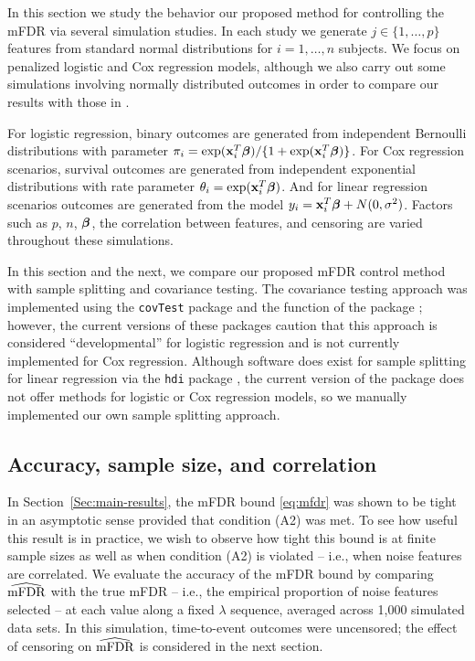 In this section we study the behavior our proposed method for controlling the mFDR via several simulation studies. In each study we generate $j \in \{1, \ldots, p\}$ features from standard normal distributions for $i = 1, \ldots, n$ subjects. We focus on penalized logistic and Cox regression models, although we also carry out some simulations involving normally distributed outcomes in order to compare our results with those in \citet{BrehenyMFDR}.

For logistic regression, binary outcomes are generated from independent Bernoulli distributions with parameter $\pi_i = \exp(\mathbf{x}_i^T \boldsymbol{\beta})/\{1 + \exp(\mathbf{x}_i^T \boldsymbol{\beta})\}$. For Cox regression scenarios, survival outcomes are generated from independent exponential distributions with rate parameter $\theta_i = \exp(\mathbf{x}_i^T \boldsymbol{\beta})$. And for linear regression scenarios outcomes are generated from the model $y_i = \mathbf{x}_i^T\boldsymbol{\beta} + N(0,\sigma^2)$. Factors such as $p$, $n$, $\boldsymbol{\beta}$, the correlation between features, and censoring are varied throughout these simulations.

In this section and the next, we compare our proposed mFDR control method with sample splitting and covariance testing.  The covariance testing approach was implemented using the {\tt covTest} package \citep{CovTest} and the  function of the  package \citep{Selective_Inference}; however, the current versions of these packages caution that this approach is considered ``developmental'' for logistic regression and is not currently implemented for Cox regression.  Although software does exist for sample splitting for linear regression via the {\tt hdi} package \cite{Dezeure2015}, the current version of the package does not offer methods for logistic or Cox regression models, so we manually implemented our own sample splitting approach.

\subsection{Accuracy, sample size, and correlation}
\label{Sec:accuracy}

In Section~\ref{Sec:main-results}, the mFDR bound \eqref{eq:mfdr} was shown to be tight in an asymptotic sense provided that condition (A2) was met.  To see how useful this result is in practice, we wish to observe how tight this bound is at finite sample sizes as well as when condition (A2) is violated -- i.e., when noise features are correlated.
We evaluate the accuracy of the mFDR bound by comparing $\widehat{\textrm{mFDR}}$ with the true mFDR -- i.e., the empirical proportion of noise features selected -- at each value along a fixed $\lambda$ sequence, averaged across 1,000 simulated data sets.
In this simulation, time-to-event outcomes were uncensored; the effect of censoring on $\widehat{\textrm{mFDR}}$ is considered in the next section.

